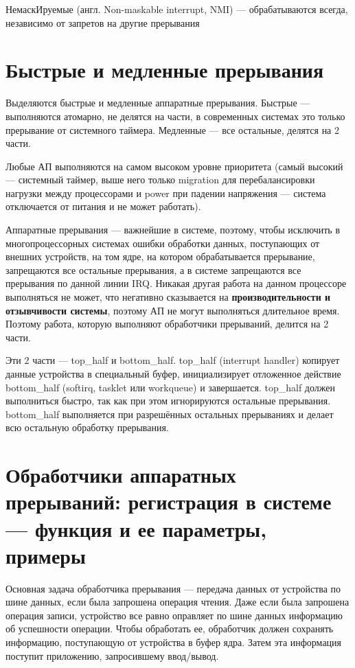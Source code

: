 НемаскИруемые (англ. Non-maskable interrupt, NMI) — обрабатываются всегда, независимо от запретов на другие прерывания

\section{Быстрые и медленные прерывания}

Выделяются быстрые и медленные аппаратные прерывания. Быстрые --- выполняются атомарно, не делятся на части, в современных системах это только прерывание от системного таймера. Медленные --- все остальные, делятся на 2 части.

Любые АП выполняются на самом высоком уровне приоритета (самый высокий --- системный таймер, выше него только migration для перебалансировки нагрузки между процессорами и power при падении напряжения --- система отключается от питания и не может работать).

Аппаратные прерывания --- важнейшие в системе, поэтому, чтобы исключить в многопроцессорных системах ошибки обработки данных, поступающих от внешних устройств, на том ядре, на котором обрабатывается прерывание, запрещаются все остальные прерывания, а в системе запрещаются все прерывания по данной линии IRQ. Никакая другая работа на данном процессоре выполняться не может, что негативно сказывается на \textbf{производительности и отзывчивости системы}, поэтому АП не могут выполняться длительное время. Поэтому работа, которую выполняют обработчики прерываний, делится на 2 части.

Эти 2 части --- top\_half и bottom\_half. top\_half (interrupt handler) копирует данные устройства в специальный буфер, инициализирует отложенное действие bottom\_half (softirq, tasklet или workqueue) и завершается. top\_half должен выполниться быстро, так как при этом игнорируются остальные прерывания. bottom\_half выполняется при разрешённых остальных прерываниях и делает всю остальную обработку прерывания.

\section{Обработчики аппаратных прерываний: регистрация в системе --- функция и ее параметры, примеры}

Основная задача обработчика прерывания --- передача данных от устройства по шине данных, если была запрошена операция чтения. Даже если была запрошена операция записи, устройство все равно оправляет по шине данных информацию об успешности операции. Чтобы обработать ее, обработчик должен сохранять информацию, поступающую от устройства в буфер ядра. Затем эта информация поступит приложению, запросившему ввод/вывод.

